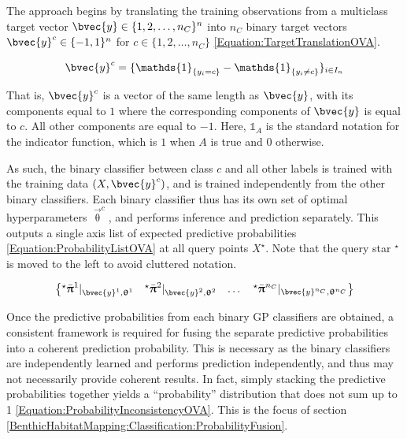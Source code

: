 				The approach begins by translating the training observations from a multiclass target vector $\bvec{y} \in \{1, 2, \dots, n_{C}\}^{n}$ into $n_{C}$ binary target vectors $\bvec{y}^{c} \in \{-1, 1\}^{n}$ for $c \in \{1, 2, \dots, n_{C}\}$ \eqref{Equation:TargetTranslationOVA}.
				
				\begin{equation}
					\bvec{y}^{c} = \{\mathds{1}_{\{y_{i} = c\}} - \mathds{1}_{\{y_{i} \neq c\}}\}_{i \in I_{n}}
				\label{Equation:TargetTranslationOVA}
				\end{equation}				
				
				That is, $\bvec{y}^{c}$ is a vector of the same length as $\bvec{y}$, with its components equal to $1$ where the corresponding components of $\bvec{y}$ is equal to $c$. All other components are equal to $-1$. Here, $\mathds{1}_{A}$ is the standard notation for the indicator function, which is $1$ when $A$ is true and $0$ otherwise.
				
				As such, the binary classifier between class $c$ and all other labels is trained with the training data $(X, \bvec{y}^{c})$, and is trained independently from the other binary classifiers. Each binary classifier thus has its own set of optimal hyperparameters $\vec{\uptheta}^{c}$, and performs inference and prediction separately. This outputs a single axis list of expected predictive probabilities \eqref{Equation:ProbabilityListOVA} at all query points $X^{\star}$. Note that the query star $^{\star}$ is moved to the left to avoid cluttered notation.
				
				\begin{equation}
					\begin{Bmatrix*}
						{^{\star}}\bar{\vec{\uppi}}^{1} |_{\bvec{y}^{1}, \vec{\uptheta}^{1}} & {^{\star}}\bar{\vec{\uppi}}^{2} |_{\bvec{y}^{2}, \vec{\uptheta}^{2}} & \dots & {^{\star}}\bar{\vec{\uppi}}^{n_{C}} |_{\bvec{y}^{n_{C}}, \vec{\uptheta}^{n_{C}}}
					\end{Bmatrix*} 
				\label{Equation:ProbabilityListOVA}
				\end{equation}
				
				Once the predictive probabilities from each binary GP classifiers are obtained, a consistent framework is required for fusing the separate predictive probabilities into a coherent prediction probability. This is necessary as the binary classifiers are independently learned and performs prediction independently, and thus may not necessarily provide coherent results. In fact, simply stacking the predictive probabilities together yields a ``probability'' distribution that does not sum up to 1 \eqref{Equation:ProbabilityInconsistencyOVA}. This is the focus of section \ref{BenthicHabitatMapping:Classification:ProbabilityFusion}.

